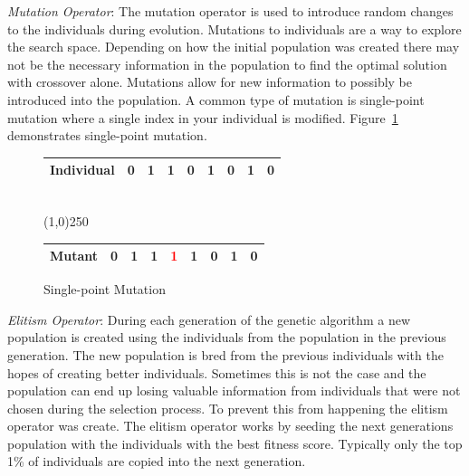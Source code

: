 \textit{Mutation Operator}: The mutation operator is used to introduce random changes to the individuals during evolution. Mutations to individuals are a way to explore the search space. Depending on how the initial population was created there may not be the necessary information in the population to find the optimal solution with crossover alone. Mutations allow for new information to possibly be introduced into the population. A common type of mutation is single-point mutation where a single index in your individual is modified. Figure~\ref{fig:mutation} demonstrates single-point mutation.

\begin{figure}[H]
  \centering
  \begin{tabular}{ | l | l | l | l | l | l | l | l | l | }
    \hline
    Individual & 0 & 1 & 1 & 0 & 1 & 0 & 1 & 0 \\
    \hline
  \end{tabular}
  \\
  \vspace{3 mm}
  \line(1,0){250}
  \\
  \vspace{3 mm}
  \begin{tabular}{ | l | l | l | l | l | l | l | l | l | }
    \hline
    Mutant & 0 & 1 & 1 & \textcolor{red}{1} & 1 & 0 & 1 & 0 \\
    \hline
  \end{tabular}
  \caption{Single-point Mutation}
  \label{fig:mutation}
\end{figure}

\textit{Elitism Operator}: During each generation of the genetic algorithm a new population is created using the individuals from the population in the previous generation. The new population is bred from the previous individuals with the hopes of creating better individuals. Sometimes this is not the case and the population can end up losing valuable information from individuals that were not chosen during the selection process. To prevent this from happening the elitism operator was create. The elitism operator works by seeding the next generations population with the individuals with the best fitness score. Typically only the top 1\% of individuals are copied into the next generation.